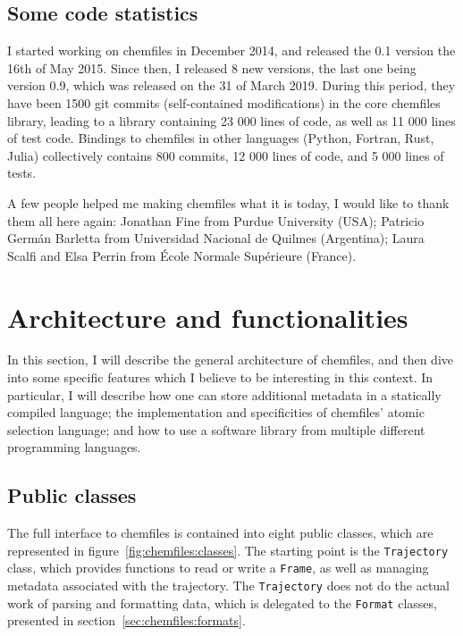 \documentclass[thesis]{subfiles}
\begin{document}
\subsection{Some code statistics}

I started working on chemfiles in December 2014, and released the 0.1 version
the 16th of May 2015. Since then, I released 8 new versions, the last one being
version 0.9, which was released on the 31 of March 2019. During this period,
they have been 1500 git commits (self-contained modifications) in the core \cxx
chemfiles library, leading to a library containing 23 000 lines of code, as well
as 11 000 lines of test code. Bindings to chemfiles in other languages (Python,
Fortran, Rust, Julia) collectively contains 800 commits, 12 000 lines of code,
and 5 000 lines of tests.

A few people helped me making chemfiles what it is today, I would like to thank
them all here again: Jonathan Fine from Purdue University (USA); Patricio Germán
Barletta from Universidad Nacional de Quilmes (Argentina); Laura Scalfi and Elsa
Perrin from École Normale Supérieure (France).

\newpage
\section{Architecture and functionalities}

In this section, I will describe the general architecture of chemfiles, and then
dive into some specific features which I believe to be interesting in this
context. In particular, I will describe how one can store additional metadata in
a statically compiled language; the implementation and specificities of chemfiles'
atomic selection language; and how to use a software library from multiple
different programming languages.

\subsection{Public classes}

The full interface to chemfiles is contained into eight public classes, which
are represented in figure~\ref{fig:chemfiles:classes}. The starting point is the
\texttt{Trajectory} class, which provides functions to read or write a
\texttt{Frame}, as well as managing metadata associated with the trajectory. The
\texttt{Trajectory} does not do the actual work of parsing and formatting data,
which is delegated to the \texttt{Format} classes, presented in
section~\ref{sec:chemfiles:formats}.
\end{document}
